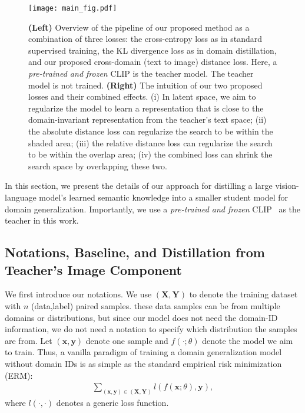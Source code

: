\documentclass[10pt,twocolumn,letterpaper]{article}
\newcommand{\X}{\mathbf{X}}
\newcommand{\Y}{\mathbf{Y}}
\newcommand{\x}{\mathbf{x}}
\newcommand{\y}{\mathbf{y}}
\begin{document}
\begin{figure*}[t]
\centering
\texttt{[image: main\_fig.pdf]}
\caption{\textbf{(Left)} Overview of the pipeline of our proposed method
as a combination of three losses: the cross-entropy loss as in standard supervised training, the KL divergence loss as in domain distillation, and our proposed cross-domain (text to image) distance loss. Here, a \emph{pre-trained and frozen} CLIP is the teacher model.  The teacher model is not trained.
\textbf{(Right)} The intuition of our two proposed losses and their combined effects. (i) In latent space, 
we aim to regularize the model to learn a representation that is close to the domain-invariant representation from the teacher's text space; (ii) the absolute distance loss can regularize the search to be within the shaded area; (iii) the relative distance loss can regularize the search to be within the overlap area; (iv) the combined loss can shrink the search space by overlapping these two. }
\label{fig:main}
\end{figure*}


In this section, we present the details of our approach for distilling a large vision-language model's learned semantic knowledge into a smaller student model for domain generalization.  Importantly, we use a \emph{pre-trained and frozen} CLIP~\cite{radford2021learning} as the teacher in this work.

\subsection{Notations, Baseline, and Distillation from Teacher's Image Component}

We first introduce our notations. 
We use $(\X, \Y)$ to denote the training dataset with $n$ (data,label) paired samples. 
these data samples can be from multiple domains or distributions, 
but 
since our model does not need the domain-ID information, 
we do not need a notation to specify which distribution the samples are from. 
Let $(\x,\y)$ denote one sample and $f(\cdot;\theta)$ denote the model we aim to train.  Thus, a vanilla paradigm of training a domain generalization 
model without domain IDs is as simple as the standard empirical risk minimization (ERM):
\begin{align}
\sum_{(\x,\y)\in(\X,\Y)}l(f(\x;\theta), \y),
    \label{eq:erm}
\end{align}
where $l(\cdot,\cdot)$ denotes a generic loss function. 
\end{document}
